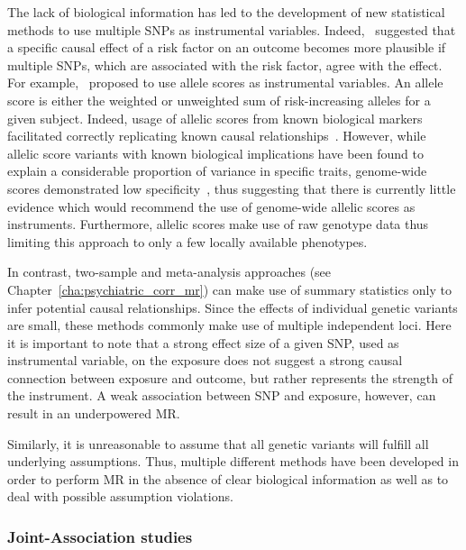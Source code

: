 The lack of biological information has led to the development of new statistical methods to use multiple SNPs as instrumental variables. 
Indeed,~\citet{Burgess2016a} suggested that a specific causal effect of a risk factor on an outcome becomes more plausible if multiple SNPs, which are associated with the risk factor, agree with the effect.
For example,~\citet{Burgess2013} proposed to use allele scores as instrumental variables.
An allele score is either the weighted or unweighted sum of risk-increasing alleles for a given subject.
Indeed, usage of allelic scores from known biological markers facilitated correctly replicating known causal relationships~\cite{Timpson2005,CReactiveProteinCoronaryHeartDiseaseGeneticsCollaborationCCGC2011}.
However, while allelic score variants with known biological implications have been found to explain a considerable proportion of variance in specific traits, genome-wide scores demonstrated low specificity~\cite{Evans2013},
thus suggesting that there is currently little evidence which would recommend the use of genome-wide allelic scores as instruments.
Furthermore, allelic scores make use of raw genotype data thus limiting this approach to only a few locally available phenotypes.

In contrast, two-sample and meta-analysis approaches (see Chapter~\ref{cha:psychiatric_corr_mr}) can make use of summary statistics only to infer potential causal relationships. 
Since the effects of individual genetic variants are small, these methods commonly make use of multiple independent loci.
Here it is important to note that a strong effect size of a given SNP, used as instrumental variable, on the exposure does not suggest a strong causal connection between exposure and outcome, but rather represents the strength of the instrument.
A weak association between SNP and exposure, however, can result in an underpowered MR\@.

Similarly, it is unreasonable to assume that all genetic variants will fulfill all underlying assumptions.
Thus, multiple different methods have been developed in order to perform MR in the absence of clear biological information as well as to deal with possible assumption violations.

\subsubsection{Joint-Association studies}
\label{ssub:sensitivity_analysis}

